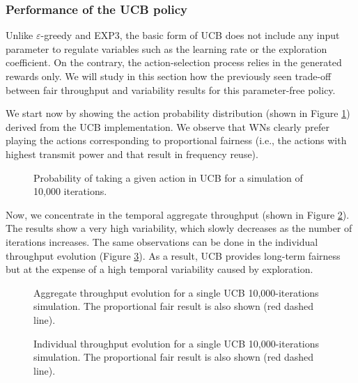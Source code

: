 \documentclass[10pt,journal,compsoc]{IEEEtran}
\begin{document}
	\subsubsection{Performance of the UCB policy}
	\label{section:ucb_study}		
	Unlike $\varepsilon$-greedy and EXP3, the basic form of UCB does not include any input parameter to regulate variables such as the learning rate or the exploration coefficient. On the contrary, the action-selection process relies in the generated rewards only. We will study in this section how the previously seen trade-off between fair throughput and variability results for this parameter-free policy.
	
	We start now by showing the action probability distribution (shown in Figure \ref{fig:actions_probability_ucb}) derived from the UCB implementation. We observe that WNs clearly prefer playing the actions corresponding to proportional fairness (i.e., the actions with highest transmit power and that result in frequency reuse). 
	\begin{figure}[h!]
		\centering							
		\caption{Probability of taking a given action in UCB for a simulation of 10,000 iterations.}
		\label{fig:actions_probability_ucb}
	\end{figure}	
	
	Now, we concentrate in the temporal aggregate throughput (shown in Figure \ref{fig:ucb_agg_tpt}). The results show a very high variability, which slowly decreases as the number of iterations increases. 
	The same observations can be done in the individual throughput evolution (Figure \ref{fig:ucb_tpt_evolution}). As a result, UCB provides long-term fairness but at the expense of a high temporal variability caused by exploration.
	\begin{figure}[t!]
		\centering							
		\caption{Aggregate throughput evolution for a single UCB 10,000-iterations simulation. The proportional fair result is also shown (red dashed line).}
		\label{fig:ucb_agg_tpt}
	\end{figure}

	\begin{figure}[t!]
		\centering							
		\caption{Individual throughput evolution for a single UCB 10,000-iterations simulation. The proportional fair result is also shown (red dashed line).}
		\label{fig:ucb_tpt_evolution}
	\end{figure}
	
\end{document}
